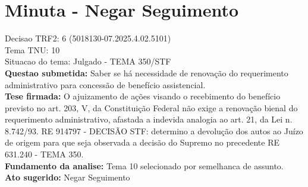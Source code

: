 \documentclass{article}
\begin{document}
\section*{Minuta - Negar Seguimento}
Decisao TRF2: 6 (5018130-07.2025.4.02.5101)\\
Tema TNU: 10\\
Situacao do tema: Julgado - TEMA 350/STF\\
\textbf{Questao submetida:} Saber se há necessidade de renovação do requerimento administrativo para concessão de benefício assistencial.\\
\textbf{Tese firmada:} O ajuizamento de ações visando o recebimento do benefício previsto no art. 203, V, da Constituição Federal não exige a renovação bienal do requerimento administrativo, afastada a indevida analogia ao art. 21, da Lei n. 8.742/93. RE 914797 - DECISÃO STF: determino a devolução dos autos ao Juízo de origem para que seja observada a decisão do Supremo no precedente RE 631.240 - TEMA 350.\\
\textbf{Fundamento da analise:} Tema 10 selecionado por semelhanca de assunto.\\
\textbf{Ato sugerido:} Negar Seguimento
\end{document}
